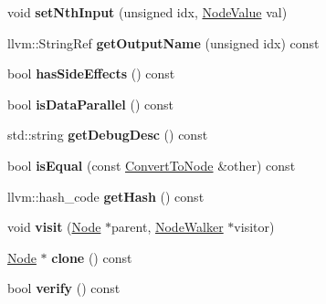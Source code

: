 \begin{DoxyCompactItemize}
\mbox{\label{classglow_1_1_convert_to_node_a9a2311e4e788a165ba3b6405158ebcb6}} 
void {\bfseries set\+Nth\+Input} (unsigned idx, \hyperlink{structglow_1_1_node_value}{Node\+Value} val)
\item 
\mbox{\label{classglow_1_1_convert_to_node_a0673ed3ef9ebd54a38d1bf613c93ec62}} 
llvm\+::\+String\+Ref {\bfseries get\+Output\+Name} (unsigned idx) const
\item 
\mbox{\label{classglow_1_1_convert_to_node_afd565888c54ad789dcbfd06505f53f9a}} 
bool {\bfseries has\+Side\+Effects} () const
\item 
\mbox{\label{classglow_1_1_convert_to_node_a3c5c0e73a8090d88c4a541a31f4e1567}} 
bool {\bfseries is\+Data\+Parallel} () const
\item 
\mbox{\label{classglow_1_1_convert_to_node_a224d9d0a12ff480362aaf4fc2f24eb59}} 
std\+::string {\bfseries get\+Debug\+Desc} () const
\item 
\mbox{\label{classglow_1_1_convert_to_node_ad787efe2560a584e15c287cd913aa510}} 
bool {\bfseries is\+Equal} (const \hyperlink{classglow_1_1_convert_to_node}{Convert\+To\+Node} \&other) const
\item 
\mbox{\label{classglow_1_1_convert_to_node_a52390e9009572775c3714d29cbdeb550}} 
llvm\+::hash\+\_\+code {\bfseries get\+Hash} () const
\item 
\mbox{\label{classglow_1_1_convert_to_node_a415f7940f50c955d9602b7209593fb7e}} 
void {\bfseries visit} (\hyperlink{classglow_1_1_node}{Node} $\ast$parent, \hyperlink{classglow_1_1_node_walker}{Node\+Walker} $\ast$visitor)
\item 
\mbox{\label{classglow_1_1_convert_to_node_afa537eb156d78be3dc4e4c4835199e46}} 
\hyperlink{classglow_1_1_node}{Node} $\ast$ {\bfseries clone} () const
\item 
\mbox{\label{classglow_1_1_convert_to_node_acaf84c1a119b0f86448a4d10b5af8e1a}} 
bool {\bfseries verify} () const
\end{DoxyCompactItemize}
